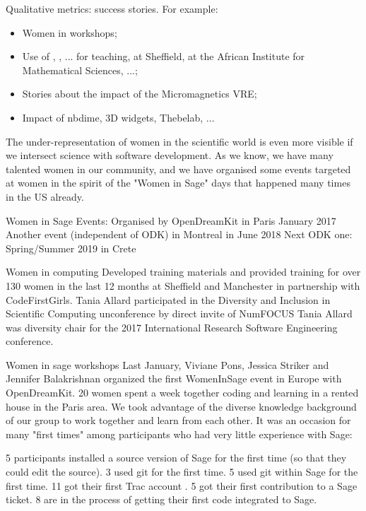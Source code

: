 \begin{Aim 1}
\begin{Aim 2}
\begin{itemize}
Qualitative metrics: success stories. For example:
\begin{itemize}
\item Women in \Sage workshops;
\item Use of \Jupyter, \cocalc, ... for teaching, at Sheffield, at the
  African Institute for Mathematical Sciences, ...;
\item Stories about the impact of the Micromagnetics VRE;
\item Impact of nbdime, 3D widgets, Thebelab, ...
\end{itemize}

   
 The under-representation of women in the scientific world is even more visible if we intersect science with software
  development. As we know, we have many talented women in our community, and we have organised some events targeted at women in the
  spirit of the "Women in Sage" days that happened many times in the US already. %

Women in Sage Events:
    Organised by OpenDreamKit in Paris January 2017
    Another event (independent of ODK) in Montreal in June 2018
    Next ODK one: Spring/Summer 2019 in Crete

Women in computing
    Developed training materials and provided training for over 130 women in the last 12 months at Sheffield and Manchester in partnership 
    with CodeFirstGirls.
    Tania Allard participated in the Diversity and Inclusion in Scientific Computing unconference by direct invite of NumFOCUS
    Tania Allard was diversity chair for the 2017 International Research Software Engineering conference.

Women in sage workshops
    Last January, Viviane Pons, Jessica Striker and Jennifer Balakrishnan organized the first WomenInSage event in Europe with OpenDreamKit.      
    20 women spent a week together coding and learning in a rented house in the Paris area.
    We took advantage of the diverse knowledge background of our group to work together and learn from each other. It was an occasion for 
    many "first times" among participants who had very little experience with Sage:

    5 participants installed a source version of Sage for the first time (so that they could edit the source).
    3 used git for the first time.
    5 used git within Sage for the first time.
    11 got their first Trac account .
    5 got their first contribution to a Sage ticket.
    8 are in the process of getting their first code integrated to Sage.


\end{itemize}
\end{Aim 2}
\end{Aim 1}
